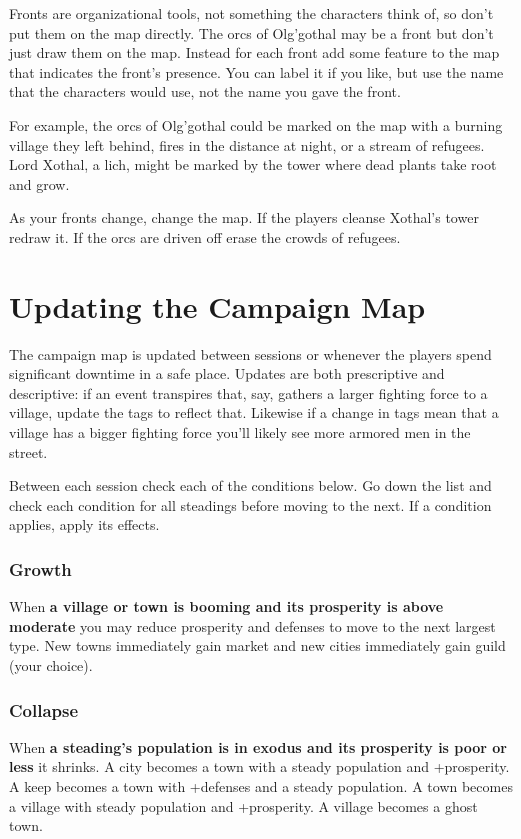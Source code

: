 Fronts are organizational tools, not something the characters think of, so don't put them on the map directly. The orcs of Olg'gothal may be a front but don't just draw them on the map. Instead for each front add some feature to the map that indicates the front's presence. You can label it if you like, but use the name that the characters would use, not the name you gave the front.


For example, the orcs of Olg'gothal could be marked on the map with a burning village they left behind, fires in the distance at night, or a stream of refugees. Lord Xothal, a lich, might be marked by the tower where dead plants take root and grow.


As your fronts change, change the map. If the players cleanse Xothal's tower redraw it. If the orcs are driven off erase the crowds of refugees.
\section*{Updating the Campaign Map}


The campaign map is updated between sessions or whenever the players spend significant downtime in a safe place. Updates are both prescriptive and descriptive: if an event transpires that, say, gathers a larger fighting force to a village, update the tags to reflect that. Likewise if a change in tags mean that a village has a bigger fighting force you'll likely see more armored men in the street.


Between each session check each of the conditions below. Go down the list and check each condition for all steadings before moving to the next. If a condition applies, apply its effects.
\subsubsection{Growth}


When \textbf{a village or town is booming and its prosperity is above moderate}
you may reduce prosperity and defenses to move to the next largest type. New towns immediately gain market and new cities immediately gain guild (your choice).
\subsubsection{Collapse}


When \textbf{a steading's population is in exodus and its prosperity is poor or less}
it shrinks. A city becomes a town with a steady population and +prosperity. A keep becomes a town with +defenses and a steady population. A town becomes a village with steady population and +prosperity. A village becomes a ghost town.
